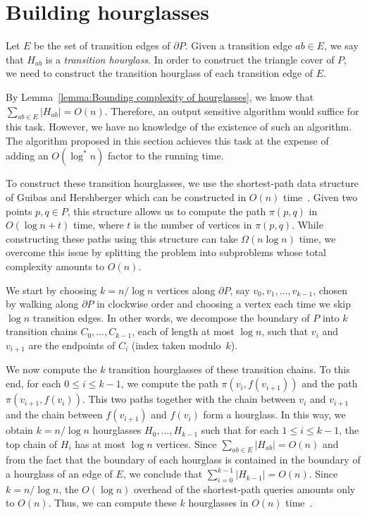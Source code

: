 \documentclass[a4paper,UKenglish]{lipics}
\newcommand{\ff}[1]{\ensuremath{f(#1)}}
\newcommand{\p}[2]{\ensuremath{\pi(#1, #2)}}
\begin{document}
\section{Building hourglasses}

Let $E$ be the set of transition edges of $\partial P$.
Given a transition edge $ab\in E$, we say that $H_{ab}$ is a \emph{transition hourglass}.
In order to construct the triangle cover of $P$, 
we need to construct the transition hourglass of each transition edge of $E$.

By Lemma~\ref{lemma:Bounding complexity of hourglasses}, we know that $\sum_{ab\in E} |H_{ab}| = O(n)$.
Therefore, an output sensitive algorithm would suffice for this task. 
However, we have no knowledge of the existence of such an algorithm. 
The algorithm proposed in this section achieves this task at the expense of adding an $O(\log^*n)$ factor to the running time.

To construct these transition hourglasses, we use the shortest-path data structure of Guibas and Hershberger which can be constructed in $O(n)$ time~\cite{guibasShortestPathQueries}. 
Given two points $p,q\in P$, this structure allows us to compute the path $\p{p}{q}$ in $O(\log n + t)$ time, where $t$ is the number of vertices in $\p{p}{q}$. 
While constructing these paths using this structure can take $\Omega(n \log n)$ time, we overcome this issue by splitting the problem into subproblems whose total complexity amounts to $O(n)$.
 
We start by choosing $k = n/ \log n$ vertices along $\partial P$, say $v_0, v_1, \ldots, v_{k-1}$, chosen by walking along $\partial P$ in clockwise order and choosing a vertex each time we skip $\log n$ transition edges. 
In other words, we decompose the boundary of $P$ into $k$ transition chains $C_0, \ldots, C_{k-1}$, each of length at most $\log n$, such that $v_i$ and $v_{i+1}$ are the endpoints of $C_i$ (index taken modulo~$k$).

We now compute the $k$ transition hourglasses of these transition chains.
To this end, for each $0\leq i\leq k-1$, we compute the path $\p{v_i}{ \ff{v_{i+1}}}$ and the path $\p{v_{i+1}}{ \ff{v_i}}$. 
This two paths together with the chain between $v_i$ and $v_{i+1}$ and the chain between $\ff{v_{i+1}}$ and $\ff{v_i}$ form a hourglass. 
In this way, we obtain $k = n/\log n$ hourglasses $H_0, \ldots, H_{k-1}$ such that for each $1\leq i\leq k-1$, the top chain of $H_i$ has at most $\log n$ vertices.
Since $\sum_{ab\in E} |H_{ab}| = O(n)$ and from the fact that the boundary of each hourglass is contained in the boundary of a hourglass of an edge of $E$, we conclude that $\sum_{i=0} ^ {k-1} |H_{k-1}| = O(n)$.
Since $k = n/\log n$, the $O(\log n)$ overhead of the shortest-path queries amounts only to $O(n)$.
Thus, we can compute these $k$ hourglasses in $O(n)$ time~\cite{guibasShortestPathQueries}. 
\end{document}
